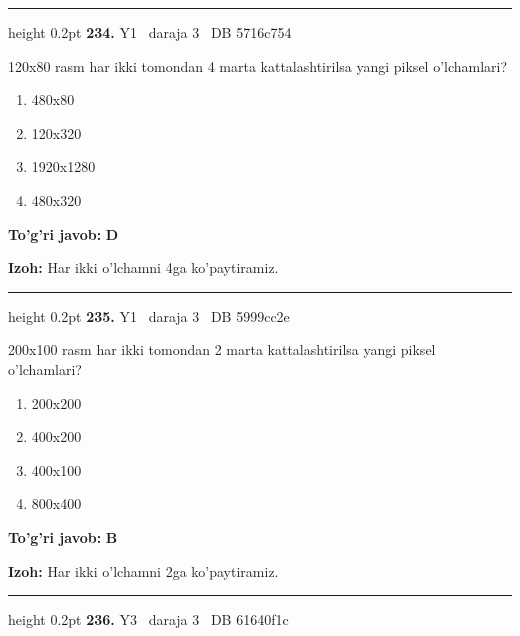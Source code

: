 \documentclass[10pt,a4paper,oneside]{article}
\begin{document}
\vspace{2mm}\hrule height 0.2pt \vspace{4mm}
\hypertarget{q234}{\textbf{\color{ink}234.}}  {\color{muted}\scriptsize Y1 \textbullet\ daraja 3 \textbullet\ DB 5716c754}
\par
120x80 rasm har ikki tomondan 4 marta kattalashtirilsa yangi piksel o'lchamlari?
\begin{enumerate}[label=\Alph*),leftmargin=9mm]
\item 480x80
\item 120x320
\item 1920x1280
\item 480x320
\end{enumerate}
\begin{tcolorbox}[enhanced,breakable,colback=teal!4,colframe=teal!45!black,boxrule=0.45pt,arc=1.2mm,left=2.8mm,right=2.8mm,top=2mm,bottom=2mm,before skip=2mm,after skip=2mm]
\textbf{\color{teal}To'g'ri javob:} \textbf{D}
\par\smallskip
\textbf{Izoh:} Har ikki o'lchamni 4ga ko'paytiramiz.
\end{tcolorbox}
\vspace{2mm}\hrule height 0.2pt \vspace{4mm}
\hypertarget{q235}{\textbf{\color{ink}235.}}  {\color{muted}\scriptsize Y1 \textbullet\ daraja 3 \textbullet\ DB 5999cc2e}
\par
200x100 rasm har ikki tomondan 2 marta kattalashtirilsa yangi piksel o'lchamlari?
\begin{enumerate}[label=\Alph*),leftmargin=9mm]
\item 200x200
\item 400x200
\item 400x100
\item 800x400
\end{enumerate}
\begin{tcolorbox}[enhanced,breakable,colback=teal!4,colframe=teal!45!black,boxrule=0.45pt,arc=1.2mm,left=2.8mm,right=2.8mm,top=2mm,bottom=2mm,before skip=2mm,after skip=2mm]
\textbf{\color{teal}To'g'ri javob:} \textbf{B}
\par\smallskip
\textbf{Izoh:} Har ikki o'lchamni 2ga ko'paytiramiz.
\end{tcolorbox}
\vspace{2mm}\hrule height 0.2pt \vspace{4mm}
\hypertarget{q236}{\textbf{\color{ink}236.}}  {\color{muted}\scriptsize Y3 \textbullet\ daraja 3 \textbullet\ DB 61640f1c}
\end{document}
